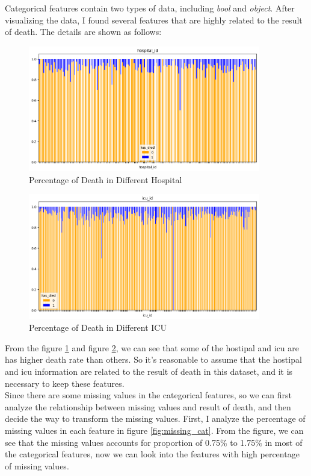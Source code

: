 \documentclass[a4paper, oneside, final, 12pt]{scrartcl} %
\begin{document}
Categorical features contain two types of data, including \emph{bool} and \emph{object}.
After visualizing the data, I found several features that are highly related to the result of death.
The details are shown as follows:

\begin{figure}[ht]
  \centering
  \includegraphics[width=0.9\textwidth]{"./image/dataset/hospital_id_dis.png"}
  \caption{Percentage of Death in Different Hospital}
  \label{fig:hospital}
\end{figure}

\begin{figure}[ht]
  \centering
  \includegraphics[width=0.9\textwidth]{"./image/dataset/icu_id_dis.png"}
  \caption{Percentage of Death in Different ICU}
  \label{fig:icu}
\end{figure}

From the figure \ref{fig:hospital} and figure \ref{fig:icu}, 
we can see that some of the hostipal and icu are has higher death rate than others.
So it's reasonable to assume that the hostipal and icu information are related to the result of death in this dataset,
and it is necessary to keep these features. \\

Since there are some missing values in the categorical features, 
so we can first analyze the relationship between missing values and result of death,
and then decide the way to transform the missing values.
First, I analyze the percentage of missing values in each feature in figure \ref{fig:missing_cat}.
From the figure, we can see that the missing values accounts for proportion of 0.75\% to 1.75\%
in most of the categorical features, now we can look into the 
features with high percentage of missing values.
\end{document}
